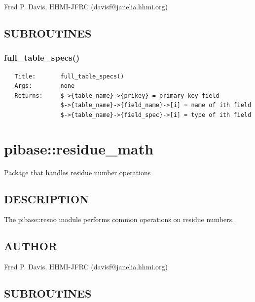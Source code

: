 \documentclass{article}
\begin{document}
Fred P. Davis, HHMI-JFRC (davisf@janelia.hhmi.org)

\subsection*{SUBROUTINES\label{pibase::raw_table_specs-_module_that_specifies_pibase_table_structures_SUBROUTINES}}
\subsubsection*{full\_table\_specs()\label{pibase::raw_table_specs-_module_that_specifies_pibase_table_structures_full_table_specs_}}
\begin{verbatim}
   Title:       full_table_specs()
   Args:        none
   Returns:     $->{table_name}->{prikey} = primary key field
                $->{table_name}->{field_name}->[i] = name of ith field
                $->{table_name}->{field_spec}->[i] = type of ith field
\end{verbatim}
\clearpage
\section{pibase::residue\_math\label{pibase::residue_math}}


Package that handles residue number operations

\subsection*{DESCRIPTION\label{pibase::residue_math_DESCRIPTION}}


The pibase::resno module performs common operations on residue numbers.

\subsection*{AUTHOR\label{pibase::residue_math_AUTHOR}}


Fred P. Davis, HHMI-JFRC (davisf@janelia.hhmi.org)

\subsection*{SUBROUTINES\label{pibase::residue_math_SUBROUTINES}}
\end{document}
